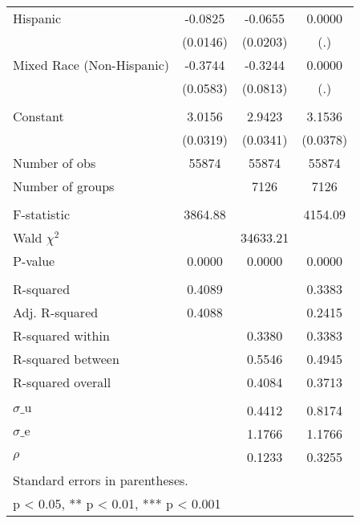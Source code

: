 {\begin{tabular}{l*{3}{c}}
Hispanic            &     -0.0825\sym{***}&     -0.0655\sym{**} &      0.0000         \\
                    &    (0.0146)         &    (0.0203)         &         (.)         \\
Mixed Race (Non-Hispanic)&     -0.3744\sym{***}&     -0.3244\sym{***}&      0.0000         \\
                    &    (0.0583)         &    (0.0813)         &         (.)         \\
                    &                     &                     &                     \\
Constant            &      3.0156\sym{***}&      2.9423\sym{***}&      3.1536\sym{***}\\
                    &    (0.0319)         &    (0.0341)         &    (0.0378)         \\
\midrule
Number of obs       &       55874         &       55874         &       55874         \\
Number of groups    &                     &        7126         &        7126         \\
\\ F-statistic      &     3864.88         &                     &     4154.09         \\
Wald $\chi^2$       &                     &    34633.21         &                     \\
P-value             &      0.0000         &      0.0000         &      0.0000         \\
\\ R-squared        &      0.4089         &                     &      0.3383         \\
Adj. R-squared      &      0.4088         &                     &      0.2415         \\
R-squared within    &                     &      0.3380         &      0.3383         \\
R-squared between   &                     &      0.5546         &      0.4945         \\
R-squared overall   &                     &      0.4084         &      0.3713         \\
\\ $\sigma\text{\_u}$&                     &      0.4412         &      0.8174         \\
$\sigma\text{\_e}$   &                     &      1.1766         &      1.1766         \\
$\rho$              &                     &      0.1233         &      0.3255         \\
\bottomrule
\multicolumn{4}{l}{\footnotesize Standard errors in parentheses.}\\
\multicolumn{4}{l}{\footnotesize * p < 0.05, ** p < 0.01, *** p < 0.001}\\
\end{tabular}
}
